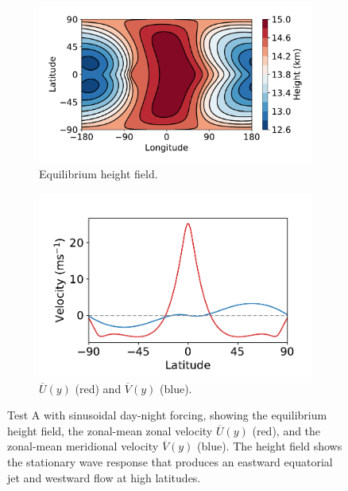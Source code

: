 \begin{figure}
  \centering
  \begin{subfigure}[t]{0.52\textwidth}
    \includegraphics[width=1.0\textwidth]{figures/eqm-zonal-flow/test-A-h.pdf}
    \caption{Equilibrium height field.}
    \label{fig:test-A-h}
  \end{subfigure}
  \begin{subfigure}[t]{0.47\textwidth}
    \includegraphics[width=1.0\textwidth]{figures/eqm-zonal-flow/test-A-u-v.pdf}
    \caption{$\overline{U}(y)$ (red) and $\overline{V}(y)$ (blue).}
    \label{fig:test-A-u-v}
  \end{subfigure}
  \caption{Test A with sinusoidal day-night forcing, showing the equilibrium height field, the zonal-mean zonal velocity $\overline{U}(y)$ (red), and the zonal-mean meridional velocity $\overline{V}(y)$ (blue). The height field shows the stationary wave response that produces an eastward equatorial jet and westward flow at high latitudes.}
  \label{fig:nonlin-test-A}


\end{figure}
